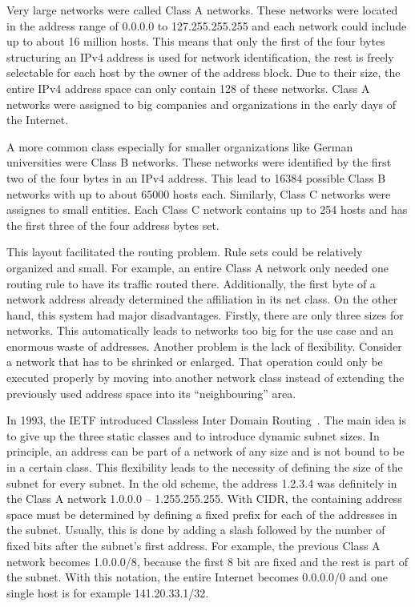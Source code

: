 \documentclass[a4paper,
		12pt,
		parskip=full,
		titlepage
		]{scrartcl}
\begin{document}
Very large networks were called Class A networks.
These networks were located in the address range of 0.0.0.0 to 127.255.255.255 and each network could include up to about 16 million hosts.
This means that only the first of the four bytes structuring an IPv4 address 
is used for network identification, the rest is freely selectable for each host by the owner of the address block.
Due to their size, the entire IPv4 address space can only contain 128 of these networks.
Class A networks were assigned to big companies and organizations in the early days of the Internet.

A more common class especially for smaller organizations like German universities were Class B networks.
These networks were identified by the first two of the four bytes in an IPv4 address.
This lead to 16384 possible Class B networks with up to about 65000 hosts each.
Similarly, Class C networks were assignes to small entities.
Each Class C network contains up to 254 hosts and has the first three of the four address bytes set.

This layout facilitated the routing problem.
Rule sets could be relatively organized and small.
For example, an entire Class A network only needed one routing rule to have its traffic routed there.
Additionally, the first byte of a network address already determined the affiliation in its net class.
On the other hand, this system had major disadvantages.
Firstly, there are only three sizes for networks.
This automatically leads to networks too big for the use case and an enormous waste of addresses.
Another problem is the lack of flexibility.
Consider a network that has to be shrinked or enlarged.
That operation could only be executed properly by moving into another network class instead of extending the 
previously used address space into its \enquote{neighbouring} area.

In 1993, the IETF introduced Classless Inter Domain Routing~\cite{rfc1518, rfc4632}.
The main idea is to give up the three static classes and to introduce dynamic subnet sizes.
In principle, an address can be part of a network of any size and is not bound to be in a certain class.
This flexibility leads to the necessity of defining the size of the subnet for every subnet.
In the old scheme, the address 1.2.3.4 was definitely in the Class A network 1.0.0.0 -- 1.255.255.255.
With CIDR, the containing address space must be determined by defining a fixed prefix for each of the addresses in the subnet.
Usually, this is done by adding a slash followed by the number of fixed bits after the subnet's first address.
For example, the previous Class A network becomes 1.0.0.0/8, because the first 8 bit are fixed and the rest is part of the subnet.
With this notation, the entire Internet becomes 0.0.0.0/0 and one single host is for example 141.20.33.1/32.
\end{document}
